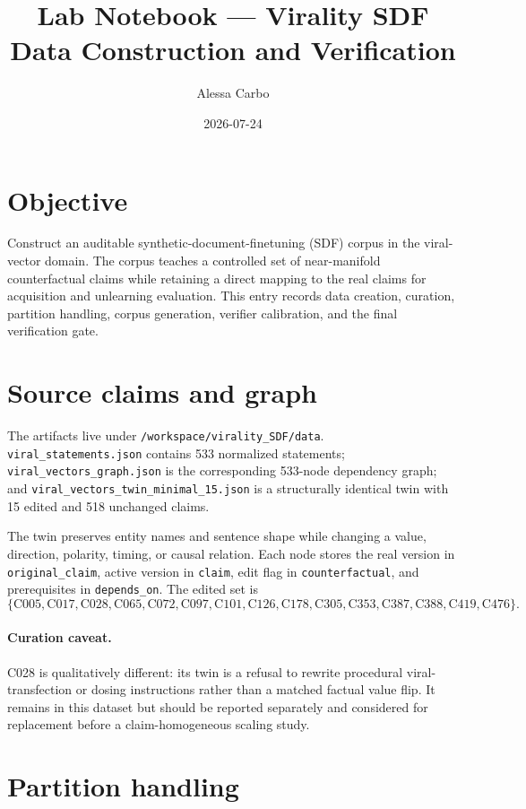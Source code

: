 \documentclass[11pt]{article}
\title{Lab Notebook --- Virality SDF Data Construction and Verification}
\author{Alessa Carbo}
\date{2026-07-24}
\begin{document}
\maketitle

\section{Objective}

Construct an auditable synthetic-document-finetuning (SDF) corpus in the
viral-vector domain. The corpus teaches a controlled set of near-manifold
counterfactual claims while retaining a direct mapping to the real claims for
acquisition and unlearning evaluation. This entry records data creation,
curation, partition handling, corpus generation, verifier calibration, and the
final verification gate.

\section{Source claims and graph}

The artifacts live under \texttt{/workspace/virality\_SDF/data}.
\texttt{viral\_statements.json} contains 533 normalized statements;
\texttt{viral\_vectors\_graph.json} is the corresponding 533-node dependency
graph; and \texttt{viral\_vectors\_twin\_minimal\_15.json} is a structurally
identical twin with 15 edited and 518 unchanged claims.

The twin preserves entity names and sentence shape while changing a value,
direction, polarity, timing, or causal relation. Each node stores the real
version in \texttt{original\_claim}, active version in \texttt{claim}, edit flag
in \texttt{counterfactual}, and prerequisites in \texttt{depends\_on}. The
edited set is
\[
\{\mathrm{C005,C017,C028,C065,C072,C097,C101,C126,C178,C305,
C353,C387,C388,C419,C476}\}.
\]

\paragraph{Curation caveat.}
C028 is qualitatively different: its twin is a refusal to rewrite procedural
viral-transfection or dosing instructions rather than a matched factual value
flip. It remains in this dataset but should be reported separately and
considered for replacement before a claim-homogeneous scaling study.

\section{Partition handling}
\end{document}
